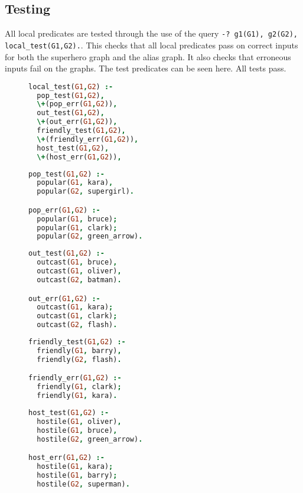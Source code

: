 \documentclass{article}
\begin{document}
\subsection{Testing}
All local predicates are tested through the use of the query \texttt{-? g1(G1), g2(G2), local\_test(G1,G2).}. This checks that all local predicates pass on correct inputs for both the superhero graph and the alias graph. It also checks that erroneous inputs fail on the graphs. The test predicates can be seen here. All tests pass.
\begin{figure}[h!]
\begin{minipage}{0.5\textwidth}
\begin{lstlisting}[language=Prolog]
local_test(G1,G2) :-
  pop_test(G1,G2),
  \+(pop_err(G1,G2)),
  out_test(G1,G2),
  \+(out_err(G1,G2)),
  friendly_test(G1,G2),
  \+(friendly_err(G1,G2)),
  host_test(G1,G2),
  \+(host_err(G1,G2)),
\end{lstlisting}
\end{minipage}
\begin{minipage}{0.5\textwidth}
\begin{lstlisting}[language=Prolog]
pop_test(G1,G2) :-
  popular(G1, kara),
  popular(G2, supergirl).

pop_err(G1,G2) :-
  popular(G1, bruce);
  popular(G1, clark);
  popular(G2, green_arrow).
\end{lstlisting}
\end{minipage}
\end{figure}
\begin{figure}[h!]
\begin{minipage}{0.33\textwidth}
\begin{lstlisting}[language=Prolog]
out_test(G1,G2) :-
  outcast(G1, bruce),
  outcast(G1, oliver),
  outcast(G2, batman).

out_err(G1,G2) :-
  outcast(G1, kara);
  outcast(G1, clark);
  outcast(G2, flash).
\end{lstlisting}
\end{minipage}
\begin{minipage}{0.33\textwidth}
\begin{lstlisting}[language=Prolog]
friendly_test(G1,G2) :-
  friendly(G1, barry),
  friendly(G2, flash).

friendly_err(G1,G2) :-
  friendly(G1, clark);
  friendly(G1, kara).
\end{lstlisting}
\end{minipage}
\begin{minipage}{0.33\textwidth}
\begin{lstlisting}[language=Prolog]
host_test(G1,G2) :-
  hostile(G1, oliver),
  hostile(G1, bruce),
  hostile(G2, green_arrow).

host_err(G1,G2) :-
  hostile(G1, kara);
  hostile(G1, barry);
  hostile(G2, superman).
\end{lstlisting}
\end{minipage}
\end{figure}
\end{document}
